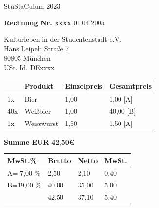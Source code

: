 \documentclass{article}
\begin{document}
    \title{\vspace{-6cm}}
    \date{}
    \maketitle
    \thispagestyle{empty}

    
    \begin{center}
        \huge StuStaCulum 2023
    \end{center}

    \vspace{1cm}
    \textbf{Rechnung Nr. xxxx} \hspace{\fill}  01.04.2005

    \begin{flushright}
        Kulturleben in der Studentenstadt e.V.\\
        Hans Leipelt Straße 7 \\
        80805 München \\
        USt. Id. DExxxx \\
    \end{flushright}

    \vspace{1cm}
    \begin{tabularx}{\textwidth}{ p{1cm} p{5cm} R R }
        & \textbf{Produkt} & \textbf{Einzelpreis} & \textbf{Gesamtpreis} \\
        \hline
        1x  & Bier             & 1,00                 & 1,00 [A]             \\
        40x & Weißbier         & 1,00                 & 40,00 [B]            \\
        1x  & Weisswurst       & 1,50                 & 1,50 [A]             \\
    \end{tabularx}


    \vspace{1cm}
    \hspace{\fill} \textbf{Summe EUR} \textbf{42,50€}

    \vspace{1cm}
    \begin{tabularx}{0.8\textwidth}{ RRRR }
        \textbf{MwSt.\%} & \textbf{Brutto} & \textbf{Netto} & \textbf{MwSt.} \\
        \hline
        A= 7,00 \%       & 2,50            & 2,10           & 0,40           \\
        B=19,00 \%       & 40,00           & 35,00          & 5,00           \\
        \hline
        & 42,50           & 37,10          & 5,40           \\
    \end{tabularx}
\end{document}
